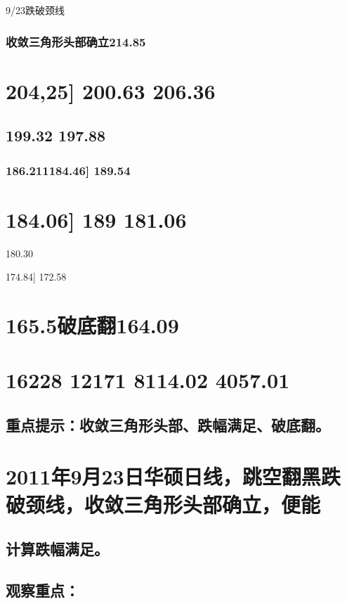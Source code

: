 \documentclass{article}
\begin{document}
9/23跌破颈线

\subsubsection{收敛三角形头部确立214.85}

\section{204,25] 200.63 206.36}

\subsection{199.32 197.88}

\subsubsection{186.211184.46] 189.54}

\section{184.06] 189 181.06}

180.30

174.84] 172.58

\section{165.5破底翻164.09}

\section{16228 12171 8114.02 4057.01}

\subsection{重点提示：收敛三角形头部、跌幅满足、破底翻。}

\section{2011年9月23日华硕日线，跳空翻黑跌破颈线，收敛三角形头部确立，便能}

\subsection{计算跌幅满足。}

\subsection{观察重点：}
\end{document}
